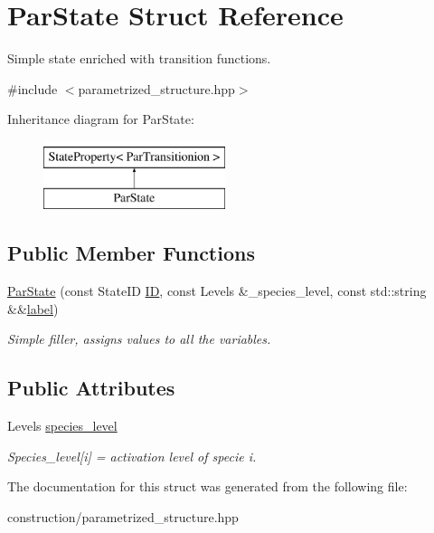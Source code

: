 \hypertarget{structParState}{\section{\-Par\-State \-Struct \-Reference}
\label{structParState}
}


\-Simple state enriched with transition functions.  




{\ttfamily \#include $<$parametrized\-\_\-structure.\-hpp$>$}

\-Inheritance diagram for \-Par\-State\-:\begin{figure}[H]
\begin{center}
\leavevmode
\includegraphics[height=2.000000cm]{structParState}
\end{center}
\end{figure}
\subsection*{\-Public \-Member \-Functions}
\begin{DoxyCompactItemize}
\item 
\hypertarget{structParState_ae4e91ec8c56886293d00718cd0756fe0}{\hyperlink{structParState_ae4e91ec8c56886293d00718cd0756fe0}{\-Par\-State} (const \-State\-I\-D \hyperlink{structStateProperty_af33be20c9033f9b6524c0447e7ac647e}{\-I\-D}, const \-Levels \&\-\_\-species\-\_\-level, const std\-::string \&\&\hyperlink{structStateProperty_a7cfb634f80b68196eefa54e8ee98a5fe}{label})}\label{structParState_ae4e91ec8c56886293d00718cd0756fe0}

\begin{DoxyCompactList}\small\item\em \-Simple filler, assigns values to all the variables. \end{DoxyCompactList}\end{DoxyCompactItemize}
\subsection*{\-Public \-Attributes}
\begin{DoxyCompactItemize}
\item 
\hypertarget{structParState_a5f55f29ca601e3fe84f42c52a26f14de}{\-Levels \hyperlink{structParState_a5f55f29ca601e3fe84f42c52a26f14de}{species\-\_\-level}}\label{structParState_a5f55f29ca601e3fe84f42c52a26f14de}

\begin{DoxyCompactList}\small\item\em \-Species\-\_\-level\mbox{[}i\mbox{]} = activation level of specie i. \end{DoxyCompactList}\end{DoxyCompactItemize}


\-The documentation for this struct was generated from the following file\-:\begin{DoxyCompactItemize}
\item 
construction/parametrized\-\_\-structure.\-hpp\end{DoxyCompactItemize}
